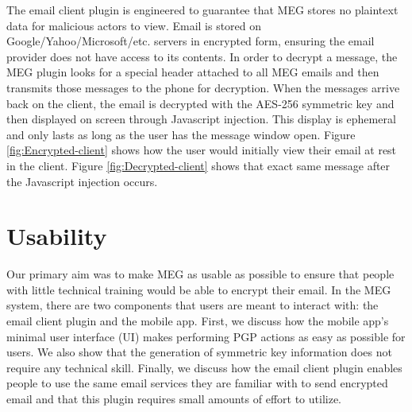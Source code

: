 \documentclass[10pt]{article}
\begin{document}
\begin{multicols}{2}
\par The email client plugin is engineered to guarantee that MEG stores no plaintext data for malicious actors to view. Email is stored on Google/Yahoo/Microsoft/etc. servers in encrypted form, ensuring the email provider does not have access to its contents. In order to decrypt a message, the MEG plugin looks for a special header attached to all MEG emails and then transmits those messages to the phone for decryption. When the messages arrive back on the client, the email is decrypted with the AES-256 symmetric key and then displayed on screen through Javascript injection. This display is ephemeral and only lasts as long as the user has the message window open. Figure \ref{fig:Encrypted-client} shows how the user would initially view their email at rest in the client. Figure \ref{fig:Decrypted-client} shows that exact same message after the Javascript injection occurs.
\section{Usability}
Our primary aim was to make MEG as usable as possible to ensure that people with little technical training would be able to encrypt their email. In the MEG system, there are two components that users are meant to interact with: the email client plugin and the mobile app. First, we discuss how the mobile app's minimal user interface (UI) makes performing PGP actions as easy as possible for users. We also show that the generation of symmetric key information does not require any technical skill. Finally, we discuss how the email client plugin enables people to use the same email services they are familiar with to send encrypted email and that this plugin requires small amounts of effort to utilize.

\end{multicols}
\end{document}
